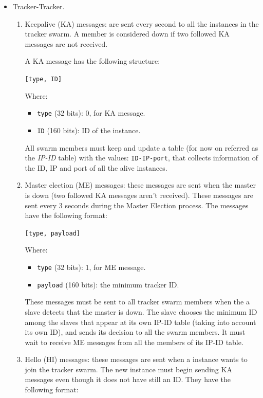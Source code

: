 \documentclass[twoside,a4paper,10pt]{article}
\begin{document}
\begin{itemize}
\item Tracker-Tracker.
  
  \begin{enumerate}
  \item Keepalive (KA) messages: are sent every second to all the instances
    in the tracker swarm. A member is considered down if two followed KA
    messages are not received.

    A KA message has the following structure:

    \texttt{[type, ID]}

    Where:
    \begin{itemize}
    \item \texttt{type} (32 bits): 0, for KA message.
    \item \texttt{ID} (160 bits): ID of the instance.
    \end{itemize}

    All swarm members must keep and update a table (for now on referred as the
    \emph{IP-ID} table) with the values: \texttt{ID-IP-port},
    that collects information of the ID, IP and port of all the alive
    instances. 
    
  \item Master election (ME) messages: these messages are sent when the master
    is down (two followed KA messages aren't received). These messages are sent
    every 3 seconds during the Master Election process. The messages have
    the following format:

    \texttt{[type, payload]}

    Where:
    \begin{itemize}
    \item \texttt{type} (32 bits): 1, for ME message.  
    \item \texttt{payload} (160 bits): the minimum tracker ID.
    \end{itemize}

    These messages must be sent to all tracker swarm members when the a slave
    detects that the master is down. The slave chooses the minimum ID among
    the slaves that appear at its own IP-ID table (taking into account its own
    ID), and sends its decision to all the swarm members. It must wait to
    receive ME messages from all the members of its IP-ID table. 
    
  \item Hello (HI) messages:
    these messages are sent when a instance wants to join the tracker swarm.
    The new instance must begin sending KA messages even though it does not
    have still an ID.
    They have the following format:


\end{enumerate}
\end{itemize}
\end{document}
